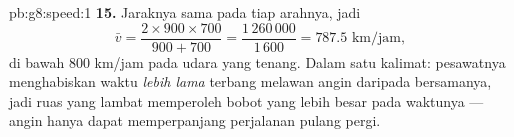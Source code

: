 \begin{solution}{pb:g8:speed:1}
\textbf{15.} Jaraknya sama pada tiap arahnya, jadi
\[
\bar v = \frac{2 \times 900 \times 700}{900 + 700}
= \frac{1\,260\,000}{1\,600} = 787.5 \text{ km/jam},
\]
di bawah $800$ km/jam pada udara yang tenang. Dalam satu kalimat:
pesawatnya menghabiskan waktu \emph{lebih lama} terbang melawan angin
daripada bersamanya, jadi ruas yang lambat memperoleh bobot yang
lebih besar pada  waktunya --- angin hanya dapat
memperpanjang perjalanan pulang pergi.

\end{solution}

